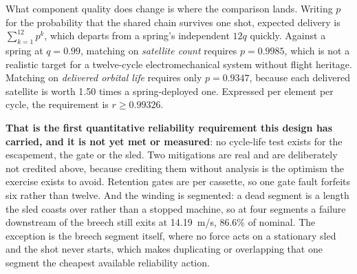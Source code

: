 \documentclass[conference]{IEEEtran}
\begin{document}
What component quality does change is where the comparison lands. Writing $p$ for the probability that the shared chain survives one shot, expected delivery is $\sum_{k=1}^{12}p^k$, which departs from a spring's independent $12q$ quickly. Against a spring at $q=0.99$, matching on \emph{satellite count} requires $p=0.9985$, which is not a realistic target for a twelve-cycle electromechanical system without flight heritage. Matching on \emph{delivered orbital life} requires only $p=0.9347$, because each delivered satellite is worth 1.50 times a spring-deployed one. Expressed per element per cycle, the requirement is $r\geq0.99326$.

\textbf{That is the first quantitative reliability requirement this design has carried, and it is not yet met or measured}: no cycle-life test exists for the escapement, the gate or the sled. Two mitigations are real and are deliberately not credited above, because crediting them without analysis is the optimism the exercise exists to avoid. Retention gates are per cassette, so one gate fault forfeits six rather than twelve. And the winding is segmented: a dead segment is a length the sled coasts over rather than a stopped machine, so at four segments a failure downstream of the breech still exits at 14.19~m/s, 86.6\% of nominal. The exception is the breech segment itself, where no force acts on a stationary sled and the shot never starts, which makes duplicating or overlapping that one segment the cheapest available reliability action.
\end{document}
